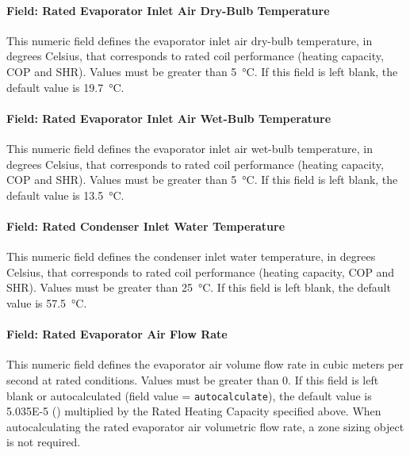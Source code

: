 \paragraph{Field: Rated Evaporator Inlet Air Dry-Bulb Temperature}\label{vshpwhheating-rated-evaporator-inlet-air-dry-bulb-temperature}

This numeric field defines the evaporator inlet air dry-bulb temperature, in degrees Celsius, that corresponds to rated coil performance (heating capacity, COP and SHR).
Values must be greater than \SI{5}{\celsius}. If this field is left blank, the default value is \SI{19.7}{\celsius}.


\paragraph{Field: Rated Evaporator Inlet Air Wet-Bulb Temperature}\label{vshpwhheating-rated-evaporator-inlet-air-wet-bulb-temperature}

This numeric field defines the evaporator inlet air wet-bulb temperature, in degrees Celsius, that corresponds to rated coil performance (heating capacity, COP and SHR).
Values must be greater than \SI{5}{\celsius}. If this field is left blank, the default value is \SI{13.5}{\celsius}.


\paragraph{Field: Rated Condenser Inlet Water Temperature}\label{vshpwhheating-rated-condenser-inlet-water-temperature}

This numeric field defines the condenser inlet water temperature, in degrees Celsius, that corresponds to rated coil performance (heating capacity, COP and SHR).
Values must be greater than \SI{25}{\celsius}. If this field is left blank, the default value is \SI{57.5}{\celsius}.


\paragraph{Field: Rated Evaporator Air Flow Rate}\label{vshpwhheating-rated-evaporator-air-flow-rate}

This numeric field defines the evaporator air volume flow rate in cubic meters per second at rated conditions. Values must be greater than 0.
If this field is left blank or autocalculated (field value = \lstinline!autocalculate!),
the default value is \SI{5.035E-5}{\volumeFlowRateperWatt} () multiplied by the Rated Heating Capacity specified above.
When autocalculating the rated evaporator air volumetric flow rate, a zone sizing object is not required.


